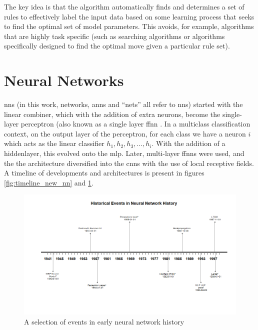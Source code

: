 
The key idea is that the algorithm automatically finds and determines a set of rules to effectively label the input data based on some learning process that seeks to find the optimal set of model parameters. This avoids, for example, algorithms that are highly task specific (such as searching algorithms or algorithms specifically designed to find the optimal move given a particular rule set). \bigskip

\section{Neural Networks} 


\gls{nn}s (in this work, networks, \gls{ann}s and \enquote{nets} all refer to \gls{nn}s) started with the linear combiner, which with the addition of extra neurons, become the single-layer perceptron (also known as a single layer \gls{ffnn} \cite{haykin}. In a multiclass classification context, on the output layer of the perceptron, for each class we have a neuron $i$ which acts as the linear classifier $h_1, h_2, h_3, ... , h_i$. With the addition of a \gls{hiddenlayer}, this evolved onto the \gls{mlp}. Later, multi-layer \gls{ffnn}s were used, and the the architecture diversified into the \gls{cnn}s with the use of local receptive fields. A timeline of developments and architectures is present in figures \ref{fig:timeline_new_nn} and \ref{fig:timeline_old_nn}. \bigskip

\begin{figure}
    \centering
    \includegraphics[width=140mm,scale=1.5]{figs/timeline_old_nn.png}
    \caption{A selection of events in early neural network history}
    \label{fig:timeline_old_nn}
\end{figure}

